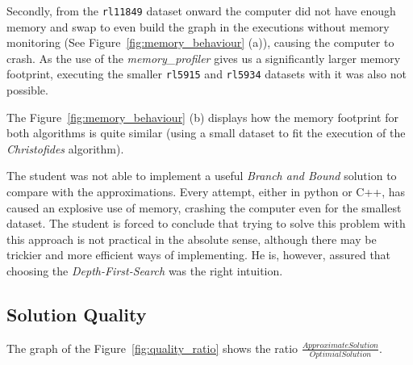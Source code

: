 \documentclass[12pt]{article}
\begin{document}

Secondly, from the \texttt{rl11849} dataset onward the computer did not have enough memory and swap to 
even build the graph in the executions without memory monitoring (See Figure~\ref{fig:memory_behaviour} 
(a)), causing the computer to crash\footnotemark. 
As the use of the \textit{memory\_profiler} gives us a significantly larger memory footprint, executing the smaller 
\texttt{rl5915} and \texttt{rl5934} datasets with it was also not possible.


The Figure~\ref{fig:memory_behaviour} (b) displays how the memory footprint for both algorithms is quite similar 
(using a small dataset to fit the execution of the \textit{Christofides} algorithm).

The student was not able to implement a useful \textit{Branch and Bound} solution to compare with the approximations. 
Every attempt, either in python or C++, has caused an explosive use of memory, crashing the computer 
even for the smallest dataset. The student is forced to conclude that trying to solve this problem with this 
approach is not practical in the absolute sense, although there may be trickier and more efficient ways of 
implementing. He is, however, assured that choosing the \textit{Depth-First-Search} was the right intuition.

\subsection{Solution Quality} \label{sec:exp_quality}

The graph of the Figure~\ref{fig:quality_ratio} shows the ratio $\frac{Approximate Solution}{Optimial Solution}$.
\end{document}
